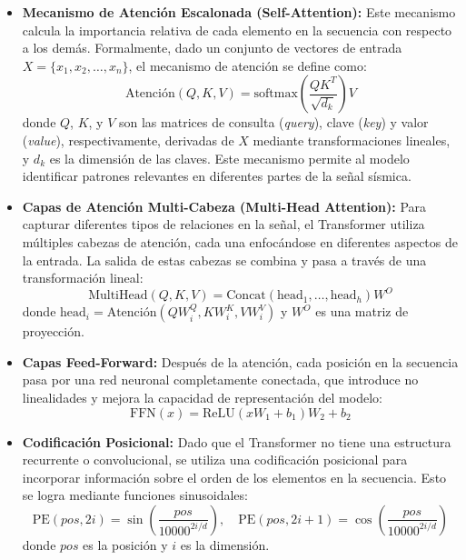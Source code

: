 \begin{itemize}
     \item \textbf{Mecanismo de Atención Escalonada (Self-Attention):} Este mecanismo calcula la importancia relativa de cada elemento en la secuencia con respecto a los demás. Formalmente, dado un conjunto de vectores de entrada $X = \{x_1, x_2, \dots, x_n\}$, el mecanismo de atención se define como:
     \begin{equation}
          \text{Atención}(Q, K, V) = \text{softmax}\left(\frac{QK^T}{\sqrt{d_k}}\right)V
     \end{equation}
     donde $Q$, $K$, y $V$ son las matrices de consulta (\textit{query}), clave (\textit{key}) y valor (\textit{value}), respectivamente, derivadas de $X$ mediante transformaciones lineales, y $d_k$ es la dimensión de las claves. Este mecanismo permite al modelo identificar patrones relevantes en diferentes partes de la señal sísmica.

     \item \textbf{Capas de Atención Multi-Cabeza (Multi-Head Attention):} Para capturar diferentes tipos de relaciones en la señal, el Transformer utiliza múltiples cabezas de atención, cada una enfocándose en diferentes aspectos de la entrada. La salida de estas cabezas se combina y pasa a través de una transformación lineal:
     \begin{equation}
          \text{MultiHead}(Q, K, V) = \text{Concat}(\text{head}_1, \dots, \text{head}_h)W^O
     \end{equation}
     donde $\text{head}_i = \text{Atención}(QW_i^Q, KW_i^K, VW_i^V)$ y $W^O$ es una matriz de proyección.

     \item \textbf{Capas Feed-Forward:} Después de la atención, cada posición en la secuencia pasa por una red neuronal completamente conectada, que introduce no linealidades y mejora la capacidad de representación del modelo:
     \begin{equation}
          \text{FFN}(x) = \text{ReLU}(xW_1 + b_1)W_2 + b_2
     \end{equation}

     \item \textbf{Codificación Posicional:} Dado que el Transformer no tiene una estructura recurrente o convolucional, se utiliza una codificación posicional para incorporar información sobre el orden de los elementos en la secuencia. Esto se logra mediante funciones sinusoidales:
     \begin{equation}
          \text{PE}(pos, 2i) = \sin\left(\frac{pos}{10000^{2i/d}}\right), \quad \text{PE}(pos, 2i+1) = \cos\left(\frac{pos}{10000^{2i/d}}\right)
     \end{equation}
     donde $pos$ es la posición y $i$ es la dimensión.

\end{itemize}

